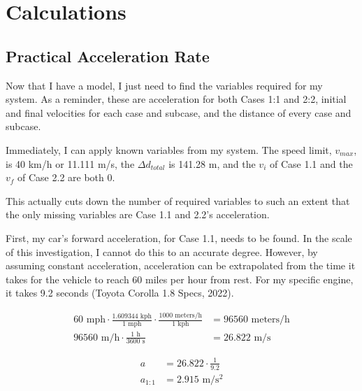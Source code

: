 \documentclass[11pt]{article}
\begin{document}
\section{Calculations}

\subsection{Practical Acceleration Rate}
Now that I have a model, I just need to find the variables required for my system. As a reminder, these are acceleration for both Cases 1:1 and 2:2, initial and final velocities for each case and subcase, and the distance of every case and subcase.

Immediately, I can apply known variables from my system. The speed limit, $v_{max}$, is 40 km/h or 11.111 m/s, the $\Delta d_{total}$ is 141.28 m, and the $v_i$ of Case 1.1 and the $v_f$ of Case 2.2 are both 0.

This actually cuts down the number of required variables to such an extent that the only missing variables are Case 1.1 and 2.2's acceleration.

First, my car's forward acceleration, for Case 1.1, needs to be found. In the scale of this investigation, I cannot do this to an accurate degree. However, by assuming constant acceleration, acceleration can be extrapolated from the time it takes for the vehicle to reach 60 miles per hour from rest. For my specific engine, it takes 9.2 seconds (Toyota Corolla 1.8 Specs, 2022).

\vspace{-0.75cm}

\begin{align*}
    60 \text{ mph} \cdot \frac{1.609344 \text{ kph}}{1 \text{ mph}} \cdot \frac{1000 \text{ meters/h}}{1 \text{ kph}} &= 96560 \text{ meters/h} \\
    96560 \text{ m/h} \cdot \frac{1 \text{ h}}{3600 \text{ s}} &= 26.822 \text{ m/s}
\end{align*} %

\vspace{-0.75cm}

\begin{align*}
    {a} &= 26.822 \cdot \frac{1}{9.2} \\
    {a_{1:1}} &= 2.915 \text{ m/s$^2$} \\
\end{align*} %
\vspace{-1.5cm}
\end{document}

